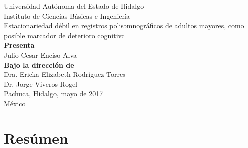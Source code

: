 \documentclass[12pt,a4paper]{mitthesis}
\begin{document}
{\begin{center}
{{{Universidad Aut\'onoma del Estado de Hidalgo\\
Instituto de Ciencias B\'asicas e Ingenier\'ia\\
}}
\vspace*{3.5em}
}
{\huge
Estacionariedad d\'ebil en registros polisomnogr\'aficos de adultos mayores,
como posible marcador de deterioro cognitivo\\
\vspace*{2.5em}
}
{\large
\textbf{Presenta}\\
\vspace*{.5em}}
{\Large
Julio Cesar Enciso Alva\\
\vspace*{3em}
}
{\large
\textbf{Bajo la direcci\'on de}\\
\vspace*{.5em}}
{\Large
Dra. Ericka Elizabeth Rodr\'iguez Torres\\
Dr. Jorge Viveros Rogel\\
\vspace*{4em}
}
{\large
Pachuca, Hidalgo, mayo de 2017\\
M\'exico
}

\end{center}
}

\newpage


\setcounter{page}{1}

\chapter*{Res\'umen}
\end{document}
